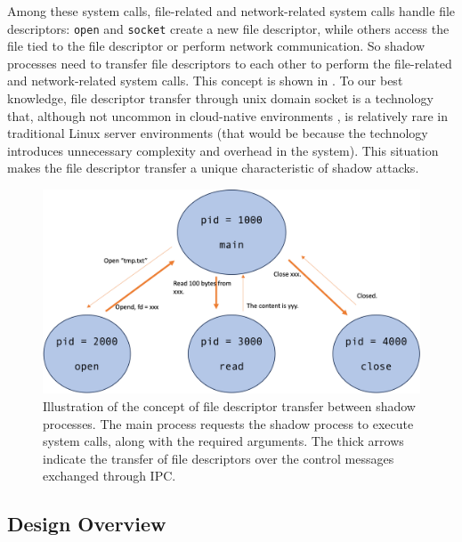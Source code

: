 Among these system calls, file-related and network-related system calls handle file descriptors:
\texttt{open} and \texttt{socket} create a new file descriptor,
while others access the file tied to the file descriptor or perform network communication.
So shadow processes need to transfer file descriptors to each other to perform the file-related and
network-related system calls. This concept is shown in .
To our best knowledge, file descriptor transfer through unix domain socket is a technology that, although not uncommon
in cloud-native environments \cite{Envoypro3:online,HAProxyT74:online},
is relatively rare in traditional Linux server environments
(that would be because the technology introduces unnecessary complexity and overhead in the system).
This situation makes the file descriptor transfer a unique characteristic of shadow attacks.

\begin{figure}[t]
  \begin{center}
    \includegraphics[width=1.8\columnwidth]{./img/fd_transfer.png}
  \end{center}
  \caption{Illustration of the concept of file descriptor transfer between shadow processes.
    The main process requests the shadow process to execute system calls, along with the required arguments.
    The thick arrows indicate the transfer of file descriptors over the control messages exchanged through IPC.}
  \label{img:fd-transfer}
\end{figure}

\subsection{Design Overview}
